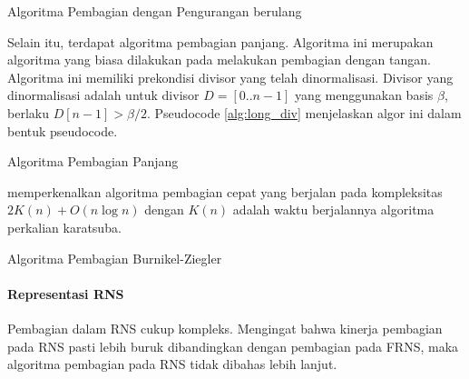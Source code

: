 \begin{algorithm}
  \caption{Algoritma Pembagian dengan Pengurangan berulang}
  \label{alg:div_repeated_sub}
  \begin{algorithmic}[1]
    \Statex
      \EndWhile
      \State {}
    \EndFunction
  \end{algorithmic}
\end{algorithm}

Selain itu, terdapat algoritma pembagian panjang. Algoritma ini merupakan algoritma yang biasa dilakukan pada melakukan pembagian dengan tangan. Algoritma ini memiliki prekondisi divisor yang telah dinormalisasi. Divisor yang dinormalisasi adalah untuk divisor $D = [0..n-1]$ yang menggunakan basis $\beta$, berlaku $D[n-1] > \beta/2$. Pseudocode \ref{alg:long_div} menjelaskan algor ini dalam bentuk pseudocode.

\begin{algorithm}
  \caption{Algoritma Pembagian Panjang}
  \label{alg:long_div}
  \begin{algorithmic}[1]
    \Statex
      \Else
      \EndIf
        \EndWhile
        \State {}
      \EndFor
    \EndFunction
  \end{algorithmic}

\end{algorithm}

\citet{div_burnikel_ziegler} memperkenalkan algoritma pembagian cepat yang berjalan pada kompleksitas $2K(n)+O(n \log n)$ dengan $K(n)$ adalah waktu berjalannya algoritma perkalian karatsuba.

\begin{algorithm}
  \caption{Algoritma Pembagian Burnikel-Ziegler}
  \label{alg:div_burnikel_ziegler}
  \begin{algorithmic}
    \Statex

    \EndFunction
  \end{algorithmic}
\end{algorithm}

\paragraph{Representasi RNS}

Pembagian dalam RNS cukup kompleks. Mengingat bahwa kinerja pembagian pada RNS pasti lebih buruk dibandingkan dengan pembagian pada FRNS, maka algoritma pembagian pada RNS tidak dibahas lebih lanjut.
